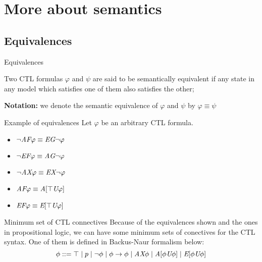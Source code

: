 \section{More about semantics}
\subsection{Equivalences}

\begin{frame}{Equivalences}
	\begin{definition}
		Two CTL formulas $\varphi$ and $\psi$ are said to be \alert{semantically	equivalent} if any state in any model which satisfies one of them also satisfies the other; 
	\end{definition}\pause
	\textbf{Notation:} we denote the semantic equivalence of $\varphi$ and $\psi$ by $\varphi \equiv \psi$
\end{frame}

\begin{frame}{Example of equivalences}
    Let $\varphi$ be an arbitrary CTL formula.
        
    \begin{itemize}
        \item
        {
            $\neg \textit{A}\textit{F} \varphi \equiv \textit{E}\textit{G} \neg \varphi $    
            \pause
        }
        \item
        {
            $\neg \textit{E}\textit{F} \varphi \equiv \textit{A}\textit{G} \neg \varphi$    
            \pause    
        }
        \item
        {
            $\neg \textit{A}\textit{X} \varphi \equiv \textit{E}\textit{X} \neg \varphi$    
            \pause
        }
        \item
        {
            $\textit{A}\textit{F}\varphi \equiv \textit{A}[\top \textit{U}\varphi]$    
            \pause
        }
        \item
        {
            $\textit{E}\textit{F} \varphi \equiv \textit{E}[\top \textit{U}\varphi]$
        }
    \end{itemize}
\end{frame}

\begin{frame}{Minimum set of CTL connectives}
    Because of the equivalences shown and the ones in propositional logic, we can have some minimum sets of conectives for the CTL syntax. One of them is defined in Backus-Naur formalism below:
    $$\phi ::=  \top \; | \; p \; | \; \neg \phi \; | \; \phi \to \phi \; | \; \textit{A}\textit{X} \phi \; | \;  \textit{A}[\phi\textit{U}\phi] \; | \; \textit{E}[\phi\textit{U}\phi]$$
\end{frame}
